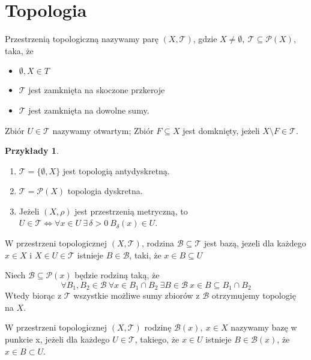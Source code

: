 \documentclass[twoside,10pt]{article}
\theoremstyle{definition}
\theoremstyle{definition}
\theoremstyle{definition}
\theoremstyle{definition}
\theoremstyle{remark}
\theoremstyle{definition}
\theoremstyle{definition}
\theoremstyle{definition}
\theoremstyle{definition}
\theoremstyle{definition}
\newtheorem*{przy}{Przykłady}
\theoremstyle{definition}
\begin{document}
\section{Topologia}
\begin{df} Przestrzenią topologiczną nazywamy parę $(X,\mathcal T)$, 
    gdzie $X \neq \emptyset,\ \mathcal T \subseteq \mathcal P (X)$, taka, że
    \begin{itemize} 
        \item $\emptyset,X \in T$
        \item $\mathcal T$ jest zamknięta na skoczone przkeroje 
        \item $\mathcal T$ jest zamknięta na dowolne sumy. 
    \end{itemize} 
    Zbiór $U \in \mathcal T$ nazywamy otwartym; Zbiór $F \subseteq X$ jest domknięty,
    jeżeli $X \setminus F \in \mathcal T$. 
\end{df} 
\begin{przy}\hfill
    \begin{enumerate}[(1)]
        \item $\mathcal T = \{ \emptyset, X \}$ jest topologią antydyskretną. 
        \item $\mathcal T = \mathcal P (X)$ topologia dyskretna. 
        \item Jeżeli $(X,\rho)$ jest przestrzenią metryczną, to $U \in \mathcal T 
            \Leftrightarrow \forall x \in U \ \exists \, \delta > 0 \ B_\delta (x) \in U$.
    \end{enumerate} 
\end{przy} 
\begin{df} 
    W przestrzeni topologicznej $(X,\mathcal T)$, rodzina $\mathcal B \subseteq \mathcal T$ jest bazą, jezeli 
    dla każdego $x \in X$ i $X \in U \in \mathcal T$ istnieje $B \in \mathcal B$, taki, że $x \in B \subseteq U$
\end{df}

\begin{tw} 
    Niech $\mathcal B \subseteq \mathcal P (x)$ będzie rodziną taką, że 
    \[ \forall B_1,B_2 \in \mathcal B \ \forall x \in B_1 \cap B_2 \ \exists B \in \mathcal B \ x \in B \subseteq 
    B_1 \cap B_2 \]
    Wtedy biorąc z $\mathcal T$ wszystkie możliwe sumy zbiorów z $\mathcal B$ otrzymujemy topologię na $X$.
\end{tw} 

\begin{df} W przestrzeni topologicznej $(X,\mathcal T)$ rodzinę $\mathcal B(x), \ x \in X$ nazywamy bazę
    w punkcie x, jeżeli dla każdego $U \in \mathcal T$, takiego, że $x \in U$ istnieje $B \in \mathcal B(x)$, że 
    $x \in B \subset U$.
\end{df} 
\end{document}

